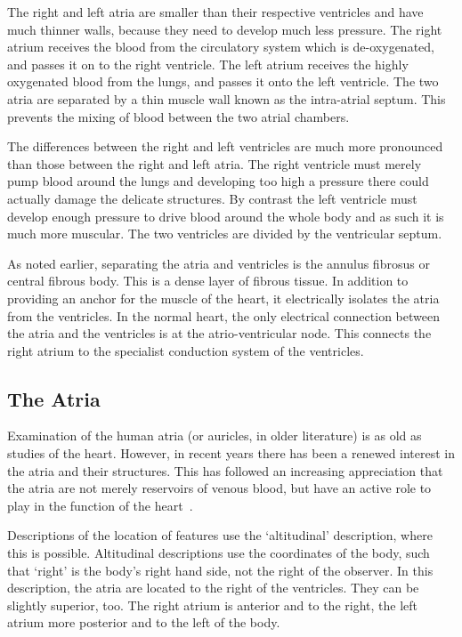 The right and left atria are smaller than their respective ventricles and have
much thinner walls, because they need to develop much less pressure.  The right
atrium receives the blood from the circulatory system which is de-oxygenated,
and passes it on to the right ventricle.  The left atrium receives the highly
oxygenated blood from the lungs, and passes it onto the left ventricle.  The two
atria are separated by a thin muscle wall known as the intra-atrial septum.
This prevents the mixing of blood between the two atrial chambers.

The differences between the right and left ventricles are much more pronounced
than those between the right and left atria.  The right ventricle must merely
pump blood around the lungs and developing too high a pressure there could
actually damage the delicate structures.  By contrast the left ventricle must
develop enough pressure to drive blood around the whole body and as such it is
much more muscular.  The two ventricles are divided by the ventricular
septum.

As noted earlier, separating the atria and ventricles is the annulus fibrosus
or central fibrous body.
This is a dense layer of fibrous tissue.
In addition to providing an anchor for the muscle of the heart, it electrically
isolates the atria from the ventricles.
In the normal heart, the only electrical connection between the atria and the
ventricles is at the atrio-ventricular node.
This connects the right atrium to the specialist conduction system of the
ventricles.

\subsection{The Atria}

Examination of the human atria (or auricles, in older literature) is as old as studies
of the heart.
However, in recent years there has been a renewed interest in the
atria and their structures.
This has followed an increasing appreciation that the atria are not merely
reservoirs of venous blood, but have an active role to play in the function of
the heart~\cite{Ho2002a,Ho2002b,Ho2009,Platonov2007,Platonov2008a}.

Descriptions of the location of features use the `altitudinal' description, where
this is possible.
Altitudinal descriptions use the coordinates of the body, such that `right' is
the body's right hand side, not the right of the observer.
In this description, the atria are located to the right of the ventricles.
They can be slightly superior, too.
The right atrium is anterior and to the right, the left atrium more posterior and to
the left of the body.

